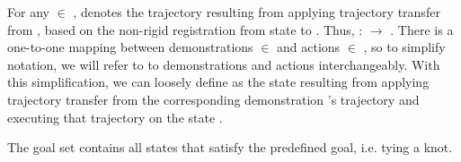 For any \demovar{} $\in$ \demoset{},  denotes the trajectory
resulting from applying trajectory transfer from , based
on the non-rigid registration from state  to \statevar{}.
Thus, \policyset{} : \transitionfn{}  \stateset{} $\rightarrow$
\stateset{}. There is a one-to-one mapping between demonstrations \demovar{}
$\in$ \demoset{} and actions \actionvar{} $\in$ \actionset{}, so to simplify
notation, we will refer to to demonstrations and actions interchangeably.
With this simplification, we can loosely define  as the
state resulting from applying trajectory transfer from the corresponding
demonstration \demovar{}'s trajectory and executing that trajectory on the
state \statevar{}.

The goal set \goalset{} contains all states that satisfy the
predefined goal, i.e. tying a knot.


